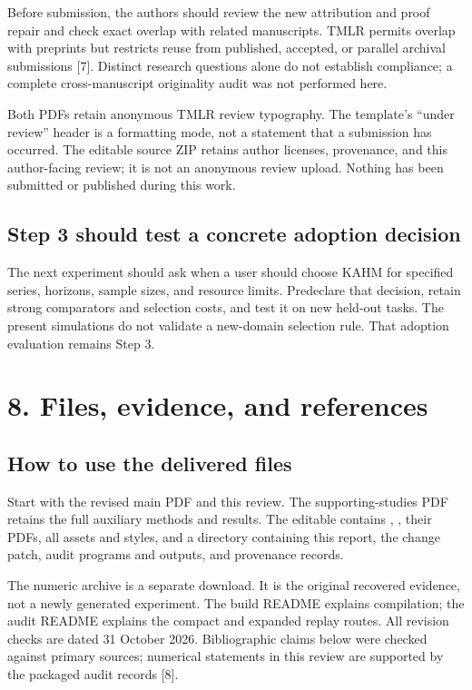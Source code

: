 \documentclass[11pt]{article}
\begin{document}
Before submission, the authors should review the new attribution and
proof repair and check exact overlap with related manuscripts. TMLR
permits overlap with preprints but restricts reuse from published,
accepted, or parallel archival submissions [7]. Distinct research
questions alone do not establish compliance; a complete cross-manuscript
originality audit was not performed here.

Both PDFs retain anonymous TMLR review typography. The template's
``under review'' header is a formatting mode, not a statement that a
submission has occurred. The editable source ZIP retains author licenses,
provenance, and this author-facing review; it is not an anonymous review
upload. Nothing has been submitted or published during this work.

\subsection*{Step 3 should test a concrete adoption decision}
The next experiment should ask when a user should choose KAHM for
specified series, horizons, sample sizes, and resource limits. Predeclare
that decision, retain strong comparators and selection costs, and test
it on new held-out tasks. The present simulations do not validate a
new-domain selection rule. That adoption evaluation remains Step 3.

\newpage
\section*{8. Files, evidence, and references}

\subsection*{How to use the delivered files}
Start with the revised main PDF and this review. The supporting-studies
PDF retains the full auxiliary methods and results. The editable
 contains ,
, their PDFs, all assets and styles, and a
 directory containing this report, the change
patch, audit programs and outputs, and provenance records.

The numeric archive  is a separate
download. It is the original recovered evidence, not a newly generated
experiment. The build README explains compilation; the audit README
explains the compact and expanded replay routes. All revision checks
are dated 31 October 2026. Bibliographic claims below were checked
against primary sources; numerical statements in this review are
supported by the packaged audit records [8].
\end{document}
